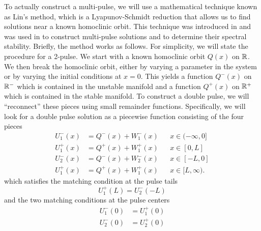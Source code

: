 \documentclass[thesis.tex]{subfiles}
\begin{document}
To actually construct a multi-pulse, we will use a mathematical technique known as Lin's method, which is a Lyapunov-Schmidt reduction that allows us to find solutions near a known homoclinic orbit. This technique was introduced in \cite{Lin1990} and was used in \cite{Sandstede1993,SandstedeStrut} to construct multi-pulse solutions and \cite{Sandstede1998} to determine their spectral stability. Briefly, the method works as follows. For simplicity, we will state the procedure for a 2-pulse. We start with a known homoclinic orbit $Q(x)$ on $\mathbb{R}$. We then break the homoclinic orbit, either by varying a parameter in the system or by varying the initial conditions at $x = 0$. This yields a function $Q^-(x)$ on $\mathbb{R}^-$ which is contained in the unstable manifold and a function $Q^+(x)$ on $\mathbb{R}^+$ which is contained in the stable manifold. To construct a double pulse, we will ``reconnect'' these pieces using small remainder functions. Specifically, we will look for a double pulse solution as a piecewise function consisting of the four pieces
\begin{align*}
U_1^-(x) &= Q^-(x) + W_1^-(x) && x \in (-\infty, 0] \\
U_1^+(x) &= Q^+(x) + W_1^+(x) && x \in [0, L] \\
U_2^-(x) &= Q^-(x) + W_2^-(x) && x \in [-L, 0] \\
U_1^+(x) &= Q^+(x) + W_1^+(x) && x \in [L, \infty).
\end{align*}
which satisfies the matching condition at the pulse tails
\begin{equation}\label{introLin1}
U_1^+(L) = U_2^-(-L)
\end{equation} 
and the two matching conditions at the pulse centers
\begin{equation}\label{introLin2}
\begin{aligned}
U_1^-(0) &= U_1^+(0) \\
U_2^-(0) &= U_2^+(0)
\end{aligned}
\end{equation} 
\end{document}
